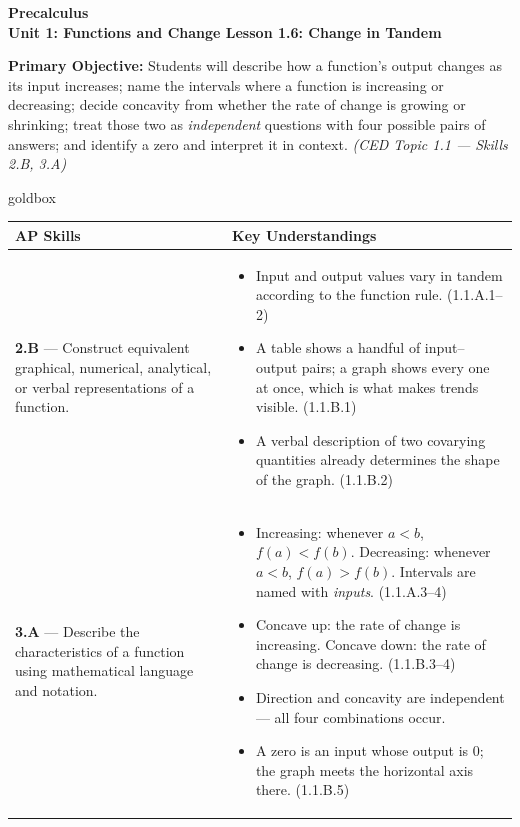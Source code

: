 \documentclass[10pt]{article}
\newcommand{\CourseName}{Precalculus}
\newcommand{\UnitNumberName}{Unit 1: Functions and Change \quad}
\newcommand{\LessonNumberName}{Lesson 1.6: Change in Tandem}
\begin{document}
\begin{center}
    {\Large\bfseries \CourseName \\
    {\small\bfseries \UnitNumberName \LessonNumberName}}
\end{center}

\begin{tcolorbox}[colback=lilac, colframe=plum, boxrule=0.9pt, arc=2mm,
    left=2mm, right=2mm, top=1.5mm, bottom=1.5mm]
    \textbf{Primary Objective:} Students will describe how a function's output
    changes as its input increases; name the intervals where a function is
    increasing or decreasing; decide concavity from whether the rate of change
    is growing or shrinking; treat those two as \textit{independent} questions
    with four possible pairs of answers; and identify a zero and interpret it
    in context. \hfill\textit{\small (CED Topic 1.1 --- Skills 2.B, 3.A)}
\end{tcolorbox}

\renewcommand{\arraystretch}{1.6}
\begin{skillbox}{goldbox}
\begin{tabularx}{\linewidth}{@{}X X@{}}
\textbf{AP Skills} &
\textbf{Key Understandings} \\
\midrule
\textbf{2.B} --- Construct equivalent graphical, numerical, analytical, or
verbal representations of a function. &
\begin{itemize}[leftmargin=1.2em,itemsep=2pt,topsep=0pt]
  \item Input and output values vary in tandem according to the function
        rule. (1.1.A.1--2)
  \item A table shows a handful of input--output pairs; a graph shows every
        one at once, which is what makes trends visible. (1.1.B.1)
  \item A verbal description of two covarying quantities already determines
        the shape of the graph. (1.1.B.2)
\end{itemize} \\
\textbf{3.A} --- Describe the characteristics of a function using
mathematical language and notation. &
\begin{itemize}[leftmargin=1.2em,itemsep=2pt,topsep=0pt]
  \item Increasing: whenever $a < b$, $f(a) < f(b)$. Decreasing: whenever
        $a < b$, $f(a) > f(b)$. Intervals are named with \textit{inputs}.
        (1.1.A.3--4)
  \item Concave up: the rate of change is increasing. Concave down: the rate
        of change is decreasing. (1.1.B.3--4)
  \item Direction and concavity are independent --- all four combinations
        occur.
  \item A zero is an input whose output is 0; the graph meets the horizontal
        axis there. (1.1.B.5)
\end{itemize} \\
\end{tabularx}
\end{skillbox}
\end{document}
